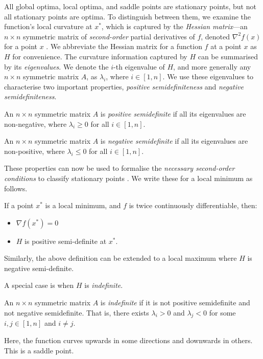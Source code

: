 All global optima, local optima, and saddle points are stationary points, but not all stationary points are optima. To distinguish between them, we examine the function's local curvature at $x^*$, which is captured by the \textit{Hessian matrix}---an $n \times n$ symmetric matrix of \textit{second-order} partial derivatives of $f$, denoted $\nabla^2 f(x)$ for a point $x$ \citep{deep_learning_book, mml_book, NoceWrig06}. We abbreviate the Hessian matrix for a function $f$ at a point $x$ as $H$ for convenience. The curvature information captured by $H$ can be summarised by its \textit{eigenvalues}. We denote the $i$-th eigenvalue of $H$, and more generally any $n \times n$ symmetric matrix $A$, as $\lambda_i$, where $i \in [1, n]$. We use these eigenvalues to characterise two important properties, \textit{positive semidefiniteness} and \textit{negative semidefiniteness}.

\begin{definition}
    An $n \times n$ symmetric matrix $A$ is \textit{positive semidefinite} if all its eigenvalues are non-negative, where $\lambda_i \geq 0$ for all $i \in [1, n]$.
\end{definition}
\begin{definition}
    An $n \times n$ symmetric matrix $A$ is \textit{negative semidefinite} if all its eigenvalues are non-positive, where $\lambda_i \leq 0$ for all $i \in [1, n]$.
\end{definition}

These properties can now be used to formalise the \textit{necessary second-order conditions} to classify stationary points \citep{NoceWrig06}. We write these for a local minimum as follows.
\begin{definition}
    If a point $x^*$ is a local minimum, and $f$ is twice continuously differentiable, then:
    \begin{itemize}
        \item $\nabla f(x^*) = 0$
        \item $H$ is positive semi-definite at $x^*$.
    \end{itemize}
    \label{definition:second_order_necessary}
\end{definition}
Similarly, the above definition can be extended to a local maximum where $H$ is negative semi-definite.

A special case is when $H$ is \textit{indefinite}.
\begin{definition}
    An $n \times n$ symmetric matrix $A$ is \textit{indefinite} if it is not positive semidefinite and not negative semidefinite. That is, there exists $\lambda_i > 0$ and $\lambda_j < 0$ for some $i, j \in [1, n]$ and $i \neq j$.
\end{definition}
Here, the function curves upwards in some directions and downwards in others. This is a saddle point.

